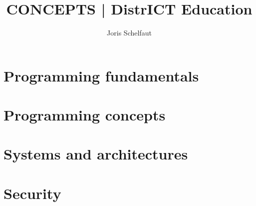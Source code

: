 \documentclass[a4paper,twoside,10pt]{book}
\title{CONCEPTS | DistrICT Education}
\author{Joris Schelfaut}
\date{}
\begin{document}
\maketitle

\cleardoublepage %
\pagestyle{fancy} %


\rmfamily
\setcounter{page}{0}





\pagestyle{empty} %
\tableofcontents %

\setcounter{page}{0}


\part{Programming fundamentals}\label{part:programming-fundamentals}





\part{Programming concepts}\label{part:programming-concepts}





\part{Systems and architectures}\label{part:systems-and-architectures}




\part{Security}\label{part:security}




\end{document}
